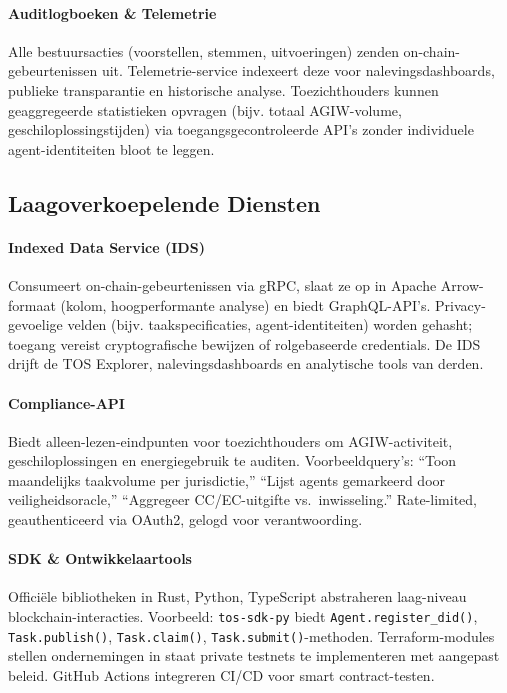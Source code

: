 \documentclass[11pt]{article}
\begin{document}
\paragraph{Auditlogboeken \& Telemetrie} Alle bestuursacties (voorstellen, stemmen, uitvoeringen) zenden on-chain-gebeurtenissen uit. Telemetrie-service indexeert deze voor nalevingsdashboards, publieke transparantie en historische analyse. Toezichthouders kunnen geaggregeerde statistieken opvragen (bijv. totaal AGIW-volume, geschiloplossingstijden) via toegangsgecontroleerde API's zonder individuele agent-identiteiten bloot te leggen.

\subsection{Laagoverkoepelende Diensten}
\paragraph{Indexed Data Service (IDS)} Consumeert on-chain-gebeurtenissen via gRPC, slaat ze op in Apache Arrow-formaat (kolom, hoogperformante analyse) en biedt GraphQL-API's. Privacy-gevoelige velden (bijv. taakspecificaties, agent-identiteiten) worden gehasht; toegang vereist cryptografische bewijzen of rolgebaseerde credentials. De IDS drijft de TOS Explorer, nalevingsdashboards en analytische tools van derden.

\paragraph{Compliance-API} Biedt alleen-lezen-eindpunten voor toezichthouders om AGIW-activiteit, geschiloplossingen en energiegebruik te auditen. Voorbeeldquery's: ``Toon maandelijks taakvolume per jurisdictie,'' ``Lijst agents gemarkeerd door veiligheidsoracle,'' ``Aggregeer CC/EC-uitgifte vs.\ inwisseling.'' Rate-limited, geauthenticeerd via OAuth2, gelogd voor verantwoording.

\paragraph{SDK \& Ontwikkelaartools} Officiële bibliotheken in Rust, Python, TypeScript abstraheren laag-niveau blockchain-interacties. Voorbeeld: \texttt{tos-sdk-py} biedt \texttt{Agent.register\_did()}, \texttt{Task.publish()}, \texttt{Task.claim()}, \texttt{Task.submit()}-methoden. Terraform-modules stellen ondernemingen in staat private testnets te implementeren met aangepast beleid. GitHub Actions integreren CI/CD voor smart contract-testen.
\end{document}
